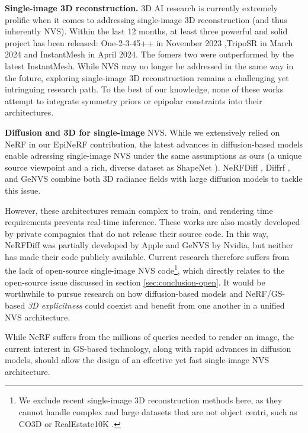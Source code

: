 \noindent \textbf{Single-image 3D reconstruction.} 3D \ac{AI} research is currently extremely prolific when it comes to addressing single-image 3D reconstruction (and thus inherently \ac{NVS}). Within the last 12 months, at least three powerful and solid project has been released:  One-2-3-45++ \citep{liu2023one2345++} in November 2023 ,TripoSR \citep{tochilkin2024triposr} in March 2024 and InstantMesh \citep{xu2024instantmesh} in April 2024. The fomers two were outperformed by the latest InstantMesh. While \ac{NVS} may no longer be addressed in the same way in the future, exploring single-image 3D reconstruction remains a challenging yet intringuing research path. To the best of our knowledge, none of these works attempt to integrate symmetry priors or epipolar constraints into their architectures. 


\noindent \textbf{Diffusion and 3D for single-image} \ac{NVS}. While we extensively relied on \ac{NeRF} in our EpiNeRF contribution, the latest advances in diffusion-based models enable adressing single-image \ac{NVS} under the same assumptions as ours (a unique source viewpoint and a rich, diverse dataset as ShapeNet \citep{chang2015shapenet}). NeRFDiff \citep{gu2023nerfdiff}, Diffrf \citep{muller2023diffrf}, and GeNVS \citep{chan2023genvs} combine both 3D radiance fields with large diffusion models to tackle this issue. 

However, these architectures remain complex to train, and rendering time requirements prevents real-time inference. These works are also mostly developed by private compagnies that do not release their source code. In this way, NeRFDiff was partially developed by Apple and GeNVS by Nvidia, but neither has made their code publicly available. Current research therefore suffers from the lack of open-source single-image \ac{NVS} code\footnote{We exclude recent single-image 3D reconstruction methods here, as they cannot handle complex and large datasets that are not object centri, such as CO3D \citep{reizenstein2021common} or RealEstate10K \citep{zhou2018stereo}.}, which directly relates to the open-source issue discussed in section \ref{sec:conclusion-open}. It would be worthwhile to pursue research on how diffusion-based models and \ac{NeRF}/\ac{GS}-based \textit{3D explicitness} could coexist and benefit from one another in a unified \ac{NVS} architecture.

While \ac{NeRF} suffers from the millions of queries needed to render an image, the current interest in \ac{GS}-based technology, along with rapid advances in diffusion models, should allow the design of an effective yet fast single-image \ac{NVS} architecture.

